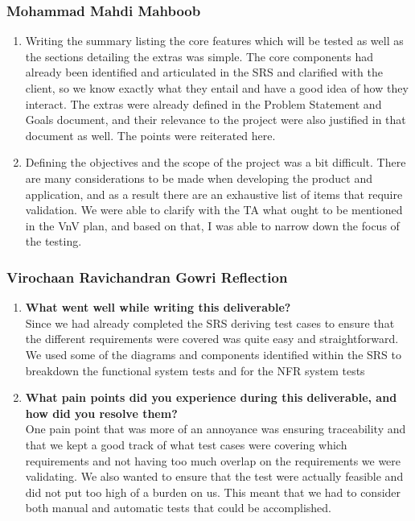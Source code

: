\documentclass[12pt, titlepage]{article}
\begin{document}
\subsubsection*{Mohammad Mahdi Mahboob}
\begin{enumerate}[align=left,
  leftmargin=*,
  labelsep=1em,
  itemindent=0em, font=\bfseries]
  \item Writing the summary listing the core features which will be tested as well as the sections detailing the extras
    was simple. The core components had already been identified and articulated in the SRS and clarified with the
    client, so we know exactly what they entail and have a good idea of how they interact. The extras were already
    defined in the Problem Statement and Goals document, and their relevance to the project were also justified in that
    document as well. The points were reiterated here.
  \item Defining the objectives and the scope of the project was a bit difficult. There are many considerations to be
    made when developing the product and application, and as a result there are an exhaustive list of items that require
    validation. We were able to clarify with the TA what ought to be mentioned in the VnV plan, and based on that, I was
    able to narrow down the focus of the testing.
\end{enumerate}
\subsubsection*{Virochaan Ravichandran Gowri Reflection}
\begin{enumerate}
  \item \textbf{What went well while writing this deliverable?} \\
  Since we had already completed the SRS deriving test cases to ensure that the different requirements were covered was quite easy and straightforward. We used some of the diagrams and components identified within the SRS to breakdown the functional system tests and for the NFR system tests
  \item \textbf{What pain points did you experience during this deliverable, and how did you resolve them?} \\
  One pain point that was more of an annoyance was ensuring traceability and that we kept a good track of what test cases were covering which requirements and not having too much overlap on the requirements we were validating. We also wanted to ensure that the test were actually feasible and did not put too high of a burden on us. This meant that we had to consider both manual and automatic tests that could be accomplished.
\end{enumerate}
\end{document}
